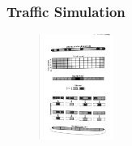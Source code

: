 \documentclass{beamer}
\begin{document}
\frame
{
  \frametitle{Traffic Simulation}

  	\begin{figure}
	\includegraphics[height = 130, align=right]{traffic}
	\end{figure}

}
\end{document}

